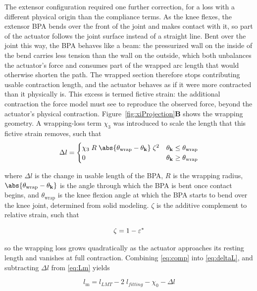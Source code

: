 The extensor configuration required one further correction, for a loss with a different physical origin than the compliance terms. As the knee flexes, the extensor BPA bends over the front of the joint and makes contact with it, so part of the actuator follows the joint surface instead of a straight line. Bent over the joint this way, the BPA behaves like a beam: the pressurized wall on the inside of the bend carries less tension than the wall on the outside, which both unbalances the actuator's force and consumes part of the wrapped arc length that would otherwise shorten the path. The wrapped section therefore stops contributing usable contraction length, and the actuator behaves as if it were more contracted than it physically is. This excess is termed fictive strain: the additional contraction the force model must see to reproduce the observed force, beyond the actuator's physical contraction. Figure~\ref{fig:xiProjection}\textbf{B} shows the wrapping geometry. A wrapping-loss term $\chi_{3}$ was introduced to scale the length that this fictive strain removes, such that
\begin{equation}
    \Delta l = \begin{cases}
     \chi_{3}\;R\;\abs{ \theta_{\mathrm{wrap}}-\theta_{\mathbf{k}}}\;\zeta^2 & \theta_{\mathbf{k}} \leq      \theta_{\mathrm{wrap}} \\
      0 & \theta_{\mathbf{k}} \geq \theta_{\mathrm{wrap}}
     \end{cases}\label{eq:deltaL}
\end{equation}

where $\Delta l$ is the change in usable length of the BPA, $R$ is the wrapping radius, $\abs{\theta_{\mathrm{wrap}}-\theta_{\mathbf{k}}}$ is the angle through which the BPA is bent once contact begins, and $\theta_{\mathrm{wrap}}$ is the knee flexion angle at which the BPA starts to bend over the knee joint, determined from solid modeling. $\zeta$ is the additive complement to relative strain, such that

\begin{equation}
    \zeta = 1-\varepsilon^*  \\
\label{eq:comp}
\end{equation}

so the wrapping loss grows quadratically as the actuator approaches its resting length and vanishes at full contraction. Combining \eqref{eq:comp} into \eqref{eq:deltaL}, and subtracting $\Delta l$ from  \eqref{eq:Lm} yields

\begin{equation}
    l_\text{m} = l_{LMT} - 2\;l_{fitting}  - \chi_{0} - \Delta l\label{eq:x3}
\end{equation}

